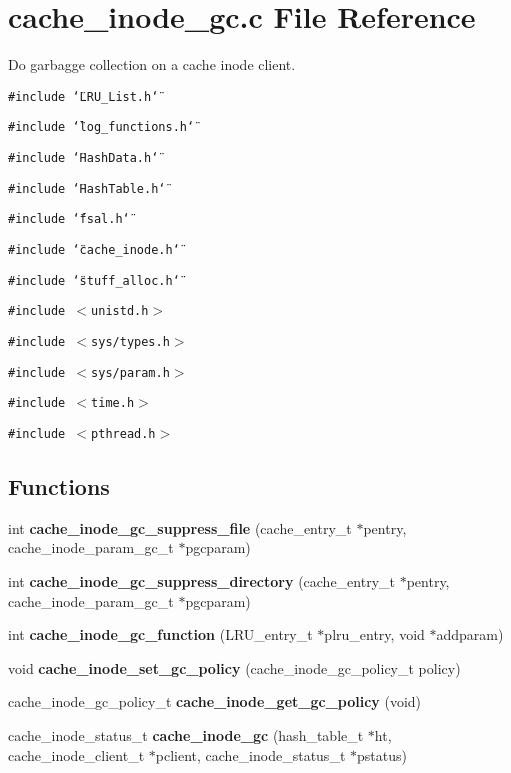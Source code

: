 \section{cache\_\-inode\_\-gc.c File Reference}
\label{cache__inode__gc_8c}
Do garbagge collection on a cache inode client. 

{\tt \#include \char`\"{}LRU\_\-List.h\char`\"{}}\par
{\tt \#include \char`\"{}log\_\-functions.h\char`\"{}}\par
{\tt \#include \char`\"{}Hash\-Data.h\char`\"{}}\par
{\tt \#include \char`\"{}Hash\-Table.h\char`\"{}}\par
{\tt \#include \char`\"{}fsal.h\char`\"{}}\par
{\tt \#include \char`\"{}cache\_\-inode.h\char`\"{}}\par
{\tt \#include \char`\"{}stuff\_\-alloc.h\char`\"{}}\par
{\tt \#include $<$unistd.h$>$}\par
{\tt \#include $<$sys/types.h$>$}\par
{\tt \#include $<$sys/param.h$>$}\par
{\tt \#include $<$time.h$>$}\par
{\tt \#include $<$pthread.h$>$}\par
\subsection*{Functions}
\begin{CompactItemize}
\item 
int {\bf cache\_\-inode\_\-gc\_\-suppress\_\-file} (cache\_\-entry\_\-t $\ast$pentry, cache\_\-inode\_\-param\_\-gc\_\-t $\ast$pgcparam)
\item 
int {\bf cache\_\-inode\_\-gc\_\-suppress\_\-directory} (cache\_\-entry\_\-t $\ast$pentry, cache\_\-inode\_\-param\_\-gc\_\-t $\ast$pgcparam)
\item 
int {\bf cache\_\-inode\_\-gc\_\-function} (LRU\_\-entry\_\-t $\ast$plru\_\-entry, void $\ast$addparam)
\item 
void {\bf cache\_\-inode\_\-set\_\-gc\_\-policy} (cache\_\-inode\_\-gc\_\-policy\_\-t policy)
\item 
cache\_\-inode\_\-gc\_\-policy\_\-t {\bf cache\_\-inode\_\-get\_\-gc\_\-policy} (void)
\item 
cache\_\-inode\_\-status\_\-t {\bf cache\_\-inode\_\-gc} (hash\_\-table\_\-t $\ast$ht, cache\_\-inode\_\-client\_\-t $\ast$pclient, cache\_\-inode\_\-status\_\-t $\ast$pstatus)
\end{CompactItemize}


